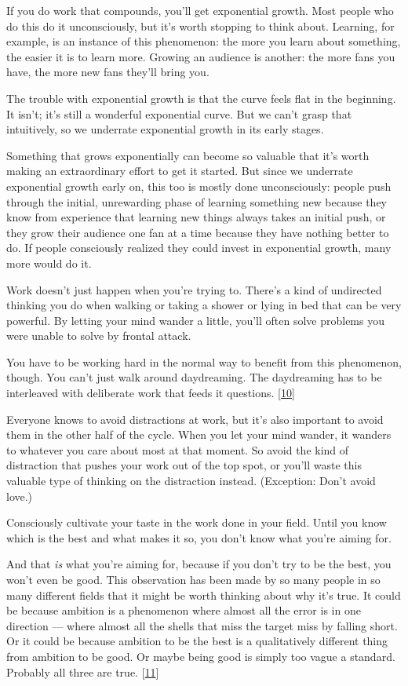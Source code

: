 If you do work that compounds, you'll get exponential growth. Most
people who do this do it unconsciously, but it's worth stopping to think
about. Learning, for example, is an instance of this phenomenon: the
more you learn about something, the easier it is to learn more. Growing
an audience is another: the more fans you have, the more new fans
they'll bring you.

The trouble with exponential growth is that the curve feels flat in the
beginning. It isn't; it's still a wonderful exponential curve. But we
can't grasp that intuitively, so we underrate exponential growth in its
early stages.

Something that grows exponentially can become so valuable that it's
worth making an extraordinary effort to get it started. But since we
underrate exponential growth early on, this too is mostly done
unconsciously: people push through the initial, unrewarding phase of
learning something new because they know from experience that learning
new things always takes an initial push, or they grow their audience one
fan at a time because they have nothing better to do. If people
consciously realized they could invest in exponential growth, many more
would do it.

Work doesn't just happen when you're trying to. There's a kind of
undirected thinking you do when walking or taking a shower or lying in
bed that can be very powerful. By letting your mind wander a little,
you'll often solve problems you were unable to solve by frontal attack.

You have to be working hard in the normal way to benefit from this
phenomenon, though. You can't just walk around daydreaming. The
daydreaming has to be interleaved with deliberate work that feeds it
questions. {[}\hyperref[f10n]{10}{]}

Everyone knows to avoid distractions at work, but it's also important to
avoid them in the other half of the cycle. When you let your mind
wander, it wanders to whatever you care about most at that moment. So
avoid the kind of distraction that pushes your work out of the top spot,
or you'll waste this valuable type of thinking on the distraction
instead. (Exception: Don't avoid love.)

Consciously cultivate your taste in the work done in your field. Until
you know which is the best and what makes it so, you don't know what
you're aiming for.

And that \emph{is} what you're aiming for, because if you don't try to
be the best, you won't even be good. This observation has been made by
so many people in so many different fields that it might be worth
thinking about why it's true. It could be because ambition is a
phenomenon where almost all the error is in one direction --- where
almost all the shells that miss the target miss by falling short. Or it
could be because ambition to be the best is a qualitatively different
thing from ambition to be good. Or maybe being good is simply too vague
a standard. Probably all three are true. {[}\hyperref[f11n]{11}{]}

